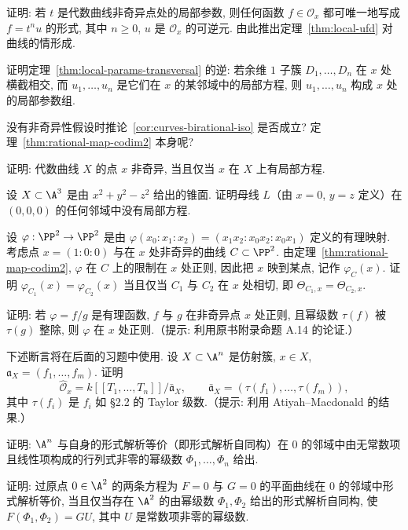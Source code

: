 \begin{compactenum}
	\item 证明: 若 $t$ 是代数曲线非奇异点处的局部参数, 则任何函数 $f \in \mathcal O_x$ 都可唯一地写成 $f = t^n u$ 的形式, 其中 $n \ge 0$, $u$ 是 $\mathcal O_x$ 的可逆元. 由此推出定理~\ref{thm:local-ufd} 对曲线的情形成.
	\item 证明定理~\ref{thm:local-params-transversal} 的逆: 若余维 $1$ 子簇 $D_1, \ldots, D_n$ 在 $x$ 处横截相交, 而 $u_1, \ldots, u_n$ 是它们在 $x$ 的某邻域中的局部方程, 则 $u_1, \ldots, u_n$ 构成 $x$ 处的局部参数组.
	\item 没有非奇异性假设时推论~\ref{cor:curves-birational-iso} 是否成立? 定理~\ref{thm:rational-map-codim2} 本身呢?
	\item 证明: 代数曲线 $X$ 的点 $x$ 非奇异, 当且仅当 $x$ 在 $X$ 上有局部方程.
	\item 设 $X \subset \A^3$ 是由 $x^2 + y^2 - z^2$ 给出的锥面. 证明母线 $L$（由 $x = 0$, $y = z$ 定义）在 $(0,0,0)$ 的任何邻域中没有局部方程.
	\item 设 $\varphi: \PP^2 \to \PP^2$ 是由 $\varphi(x_0 : x_1 : x_2) = (x_1 x_2 : x_0 x_2 : x_0 x_1)$ 定义的有理映射. 考虑点 $x = (1 : 0 : 0)$ 与在 $x$ 处非奇异的曲线 $C \subset \PP^2$. 由定理~\ref{thm:rational-map-codim2}, $\varphi$ 在 $C$ 上的限制在 $x$ 处正则, 因此把 $x$ 映到某点, 记作 $\varphi_C(x)$. 证明 $\varphi_{C_1}(x) = \varphi_{C_2}(x)$ 当且仅当 $C_1$ 与 $C_2$ 在 $x$ 处相切, 即 $\Theta_{C_1,x} = \Theta_{C_2,x}$.
	\item 证明: 若 $\varphi = f/g$ 是有理函数, $f$ 与 $g$ 在非奇异点 $x$ 处正则, 且幂级数 $\tau(f)$ 被 $\tau(g)$ 整除, 则 $\varphi$ 在 $x$ 处正则.（提示: 利用原书附录命题 A.14 的论证.）
	\item 下述断言将在后面的习题中使用. 设 $X \subset \A^n$ 是仿射簇, $x \in X$, $\mathfrak a_X = (f_1, \ldots, f_m)$. 证明
	\[
		\widehat{\mathcal O}_x = k[[T_1, \ldots, T_n]]/\bar{\mathfrak a}_X, \qquad \bar{\mathfrak a}_X = (\tau(f_1), \ldots, \tau(f_m)),
	\]
	其中 $\tau(f_i)$ 是 $f_i$ 如 §2.2 的 Taylor 级数.（提示: 利用 Atiyah--Macdonald \cite[第 10 章]{atiyah-macdonald1969} 的结果.）
	\item 证明: $\A^n$ 与自身的形式解析等价（即形式解析自同构）在 $0$ 的邻域中由无常数项且线性项构成的行列式非零的幂级数 $\Phi_1, \ldots, \Phi_n$ 给出.
	\item 证明: 过原点 $0 \in \A^2$ 的两条方程为 $F = 0$ 与 $G = 0$ 的平面曲线在 $0$ 的邻域中形式解析等价, 当且仅当存在 $\A^2$ 的由幂级数 $\Phi_1, \Phi_2$ 给出的形式解析自同构, 使 $F(\Phi_1, \Phi_2) = G U$, 其中 $U$ 是常数项非零的幂级数.

\end{compactenum}
